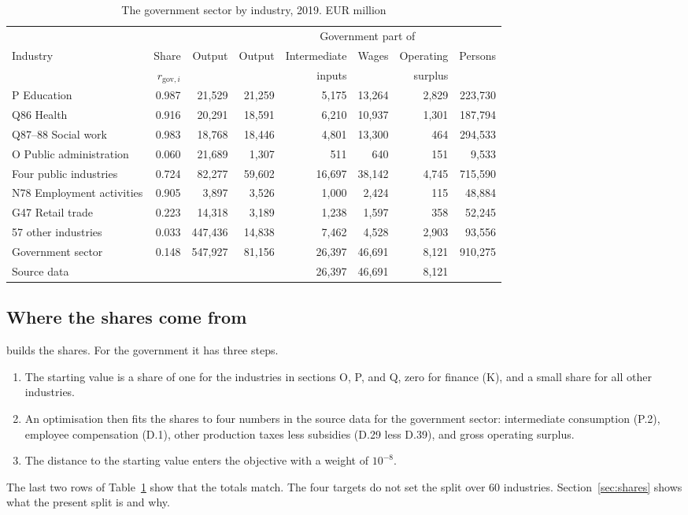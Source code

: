 \documentclass[11pt,a4paper]{article}
\newcommand{\code}[1]{\texttt{\detokenize{#1}}}
\newcommand{\gov}{\mathrm{gov}}
\begin{document}
\begin{table}[!htbp]
\centering
\small
\caption{The government sector by industry, 2019. EUR million}
\label{tab:gov}
\begin{tabular}{@{}lrrrrrrr@{}}
\toprule
 & & & \multicolumn{5}{c}{Government part of} \\
\cmidrule(l){4-8}
Industry & Share & Output & Output & Intermediate & Wages & Operating & Persons \\
 & $r_{\gov,i}$ & & & inputs & & surplus & \\
\midrule
P Education & 0.987 & 21,529 & 21,259 & 5,175 & 13,264 & 2,829 & 223,730 \\
Q86 Health & 0.916 & 20,291 & 18,591 & 6,210 & 10,937 & 1,301 & 187,794 \\
Q87--88 Social work & 0.983 & 18,768 & 18,446 & 4,801 & 13,300 & 464 & 294,533 \\
O Public administration & 0.060 & 21,689 & 1,307 & 511 & 640 & 151 & 9,533 \\
\midrule
Four public industries & 0.724 & 82,277 & 59,602 & 16,697 & 38,142 & 4,745 & 715,590 \\
\midrule
N78 Employment activities & 0.905 & 3,897 & 3,526 & 1,000 & 2,424 & 115 & 48,884 \\
G47 Retail trade & 0.223 & 14,318 & 3,189 & 1,238 & 1,597 & 358 & 52,245 \\
57 other industries & 0.033 & 447,436 & 14,838 & 7,462 & 4,528 & 2,903 & 93,556 \\
\midrule
Government sector & 0.148 & 547,927 & 81,156 & 26,397 & 46,691 & 8,121 & 910,275 \\
Source data & & & & 26,397 & 46,691 & 8,121 & \\
\bottomrule
\end{tabular}
\end{table}

\FloatBarrier
\subsection{Where the shares come from}

\code{IndustrySectorsData.jl} builds the shares. For the government it has three steps.
\begin{enumerate}
\item The starting value is a share of one for the industries in sections O, P, and Q, zero for finance (K), and a small share for all other industries.
\item An optimisation then fits the shares to four numbers in the source data for the government sector: intermediate consumption (P.2), employee compensation (D.1), other production taxes less subsidies (D.29 less D.39), and gross operating surplus.
\item The distance to the starting value enters the objective with a weight of $10^{-8}$.
\end{enumerate}
The last two rows of Table~\ref{tab:gov} show that the totals match. The four targets do not set the split over 60 industries.
Section~\ref{sec:shares} shows what the present split is and why.
\end{document}
